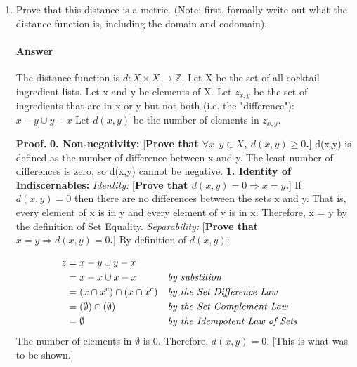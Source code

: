 \documentclass{article}
\begin{document}
\begin{enumerate}

    \item Prove that this distance is a metric. (Note: first, formally write out
        what the distance function is, including the domain and codomain).

        \paragraph{Answer}

    The distance function is $d: X \times X \rightarrow \mathbb{Z}$.
    Let X be the set of all cocktail ingredient lists. Let x and y be elements of X.
    Let $z_{x,y}$ be the set of ingredients that are in x or y but not both (i.e. the "difference"):  $x-y \cup y-x$
    Let $d(x,y)$ be the number of elements in $z_{x,y}$.

\textbf{Proof.}
\newline
\textbf{0. Non-negativity:} [\textbf{Prove that $\forall x,y \in X$, $d(x,y) \geq 0$.}] \newline d(x,y) is defined as the number of difference between x and y. The least number of differences is zero, so d(x,y) cannot be negative. \newline
\textbf{1. Identity of Indiscernables:} \newline
\emph{Identity:} [\textbf{Prove that $d(x,y) = 0 \Rightarrow x = y$.}] \newline If $d(x,y) = 0$ then there are no differences between the sets x and y. That is, every element of x is in y and every element of y is in x. Therefore, x = y by the definition of Set Equality.
\newline \emph{Separability:} [\textbf{Prove that $x=y\Rightarrow  d(x,y) = 0$.}] \newline By definition of $d(x,y)$:

\begin{align}
    z &= x-y \cup y-x \\
    &= x-x \cup x-x && \text{\emph{by substition}} \\
    &= (x \cap x^c) \cap (x \cap x^c) && \text{\emph{by the Set Difference Law}} \\
    &= (\emptyset) \cap (\emptyset) &&  \text{\emph{by the Set Complement Law}} \\
    &= \emptyset && \text{\emph{by the Idempotent Law of Sets}} 
\end{align}
The number of elements in $\emptyset$ is 0. Therefore, $d(x,y) = 0$. [This is what was to be shown.]


\end{enumerate}
\end{document}
